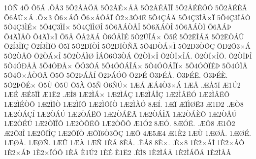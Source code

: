 {1^^d4^^d1
4^^d5
^^d55^^c1
.^^d5^^c23
5^^d52^^c2^^c5^^d6^^c4
5^^d52^^c2^^c9^^d7^^c5^^c3
5^^d52^^c2^^c9^^c5^^ce^^ce
5^^d52^^c2^^c9^^ca^^d3^^d4
5^^d52^^c2^^c9^^ca^^c3
^^d56^^c2^^d9^^d7^^c1
.^^d5^^d73
^^d56^^d7^^c1^^d6
^^d56^^d7^^c5^^d2^^c5^^ce
^^d52^^d73^^d34^^cb
5^^d54^^c7^^c1^^c4
5^^d54^^c73^^cc^^c5^^d7^^cf
5^^d54^^c73^^cc^^c5^^d2
5^^d54^^c73^^cc^^c9^^d7
5^^d54^^c73^^cc^^cf^^d7
5^^d54^^c7^^cf^^cc^^d8^^ce
5^^d56^^c4^^c1^^d2^^c5^^ce
5^^d56^^c4^^c1^^d2^^ce
5^^d56^^c4^^c1^^d2^^cf
^^d56^^c4^^c1^^de
^^d54^^c4^^cf^^c2^^d2
^^d54^^c4^^cf^^d7^^cc
^^d55^^c5
^^d5^^c52^^c4^^c1
^^d56^^d6^^c5^^cc^^c9
5^^d52^^da^^ce^^c1^^d7
^^d55^^c9
5^^d52^^cb^^cc^^c1^^c4
5^^d52^^cb^^d2^^c1^^db
^^d52^^cd3^^ce^^cf^^c7
^^d52^^cd3^^ce^^cf^^d6
^^d55^^cf
5^^d52^^d0^^cf^^d2^^ce
5^^d52^^d0^^cf^^d2^^d1^^c4
5^^d54^^d0^^d2^^c1^^d7^^cc
5^^d52^^d03^^d2^^d5^^c7
^^d5^^d02^^d43^^d7^^c1
5^^d52^^d2^^c5^^d4
^^d52^^d2^^c1^^d7^^ce
5^^d52^^d2^^c1^^cc^^d8
^^ce^^c1^^d46^^d53^^d2^^c1
^^d52^^d2^^cf^^d7^^ce
^^d52^^d2^^cf^^d7^^ce^^c1.
^^d52^^d2^^cf^^d7^^ce^^d5.
^^d52^^d2^^cf^^de^^ce
5^^d54^^d3^^d0^^c5^^c5
5^^d54^^d3^^d0^^c5^^d7
^^d5^^d33^^d4^^c1
5^^d54^^d3^^d4^^c1^^ce^^c1^^d7
5^^d54^^d3^^d4^^c1^^ce^^cf^^d7
5^^d54^^d3^^d4^^cf^^ca^^de
5^^d54^^d3^^cf^^c2
5^^d54^^d4^^d7^^c5^^d2^^d6^^c4
^^d55^^d5
5^^d52^^de^^c1^^c5^^cd
^^d52^^de^^c1^^d3^^d4
^^d52^^de^^c9
^^d53^^de^^c9^^c5.
^^d53^^de^^c9^^ca.
^^d53^^de^^c9^^c8.
5^^d52^^de^^d4^^c9^^d7
^^d55^^d9
^^d55^^dc
^^d55^^c0
^^d55^^d1
^^d56^^d1^^da^^d7
1^^c6^^c1
^^c6^^c14^^d23^^d7^^c1
1^^c6^^c5
.^^c6^^c55^^cf
^^c61^^da2
1^^c6^^c9
^^c6^^c95^^cf^^cc
^^c61^^cb2
.^^c6^^cc8
1^^c62^^cc^^c1^^d7
1^^c62^^cc^^c1^^c7
1^^c62^^cc^^c1^^ce^^c7
1^^c62^^cc^^c5^^cb^^d3
1^^c62^^cc^^c5^^cb^^d4
1^^c62^^cc^^c9^^d2^^d4
1^^c62^^cc^^cf^^d2
1^^c62^^cc^^cf^^d4
1^^c62^^cc^^d5^^cf^^d2
1^^c62^^cc^^c0^^d3
8^^c6^^cd.
1^^c6^^cf
^^c6^^cf^^cc^^d8^^cb3
^^c61^^d02
.^^c6^^d28
1^^c62^^d2^^c1^^c7^^cd
1^^c62^^d2^^c1^^da
1^^c62^^d2^^c1^^cb^^d4
1^^c62^^d2^^c1^^cb^^c3
1^^c62^^d2^^c1^^ce^^c3
1^^c62^^d2^^c1^^c8^^d4
1^^c62^^d2^^c5^^da
1^^c62^^d2^^c9^^da
1^^c62^^d2^^cf^^ce^^d4
1^^c62^^d2^^d5^^cb^^d4
1^^c62^^d2^^d5^^d4
^^c61^^d32
8^^c6^^d3.
8^^c6^^d3^^cb.
.^^c6^^d48
^^c61^^d42
^^c62^^d43^^ce
1^^c62^^d4^^cf^^ce^^c7
1^^c62^^d4^^cf^^d2
^^c6^^d4^^cf6^^d23^^d5^^c7
1^^c6^^d5
4^^c65^^c64
^^c61^^c82
1^^c6^^d9
1^^c6^^d8^^c5.
1^^c6^^d8^^c9.
1^^c6^^d8^^c0.
1^^c6^^d8^^d1.
1^^c6^^dc
1^^c6^^c0
1^^c6^^d1
1^^c8^^c1
8^^c8^^c2.
.^^c8^^c28
8^^c8^^d7.
.^^c8^^d78
1^^c82^^d7^^c1^^cc
1^^c82^^d7^^c1^^d4
1^^c82^^d7^^c1^^de
1^^c82^^d7^^cf^^d3^^d4
1^^c8^^c5
^^c81^^da2
1^^c8^^c9
^^c81^^cb2
.^^c8^^cc8
1^^c82^^cc^^c1^^c4
1^^c82^^cc^^c1^^d6^^c4
1^^c82^^cc^^c5^^c2
}

